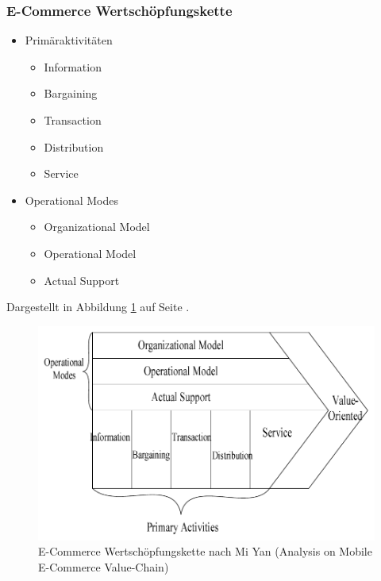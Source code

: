 \subsubsection{E-Commerce Wertschöpfungskette}
\begin{itemize}
	\item Primäraktivitäten 
	\begin{itemize}
		\item Information
		\item Bargaining
		\item Transaction
		\item Distribution
		\item Service
	\end{itemize}
	\item Operational Modes
	\begin{itemize}
		\item Organizational Model
		\item Operational Model
		\item Actual Support
	\end{itemize}
\end{itemize}
Dargestellt in Abbildung \ref{fig:ecvc_00} auf Seite \pageref{fig:ecvc_00}.
\begin{figure}[htb]
\centering
\includegraphics[width=\textwidth]{img/value_chain_ec1.png}
\caption{E-Commerce Wertschöpfungskette nach Mi Yan (Analysis on Mobile E-Commerce Value-Chain)}
\label{fig:ecvc_00}
\end{figure}
